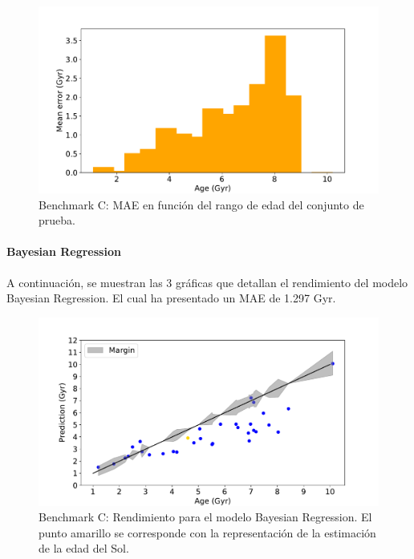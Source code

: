 \begin{figure}[H]
\begin{center}
 \includegraphics[width=0.8\linewidth]{Figuras/Experimentos/B_C_lr_3.pdf}
\end{center}
\caption{Benchmark C: MAE en función del rango de edad del conjunto de prueba.}
 \label{fig:benchC_details_lr_3}
\end{figure}

\paragraph{Bayesian Regression} 
A continuación, se muestran las 3 gráficas que detallan el rendimiento del modelo Bayesian Regression. El cual ha presentado un MAE de 1.297 Gyr.

\begin{figure}[H]
\begin{center}
 \includegraphics[width=0.8\linewidth]{Figuras/Experimentos/B_C_bayes_1.pdf}
\end{center}
\caption{Benchmark C: Rendimiento para el modelo Bayesian Regression. El punto amarillo se corresponde con la representación de la estimación de la edad del Sol.}
 \label{fig:benchC_details_bayes_1}
\end{figure}

